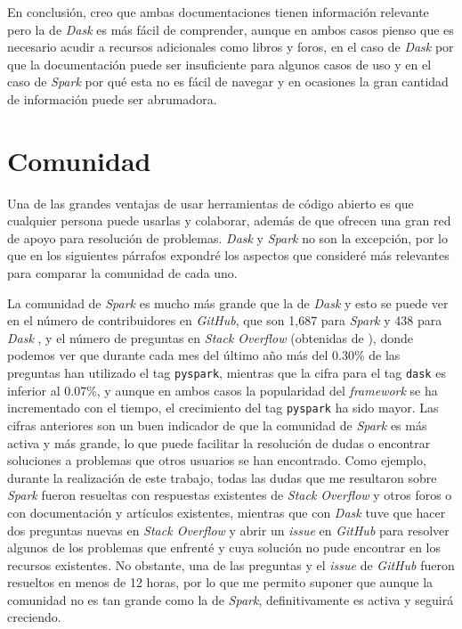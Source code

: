 En conclusión, creo que ambas documentaciones tienen información relevante pero la de \textit{Dask} es más fácil de comprender, aunque en ambos casos pienso que es necesario acudir a recursos adicionales como libros y foros, en el caso de \textit{Dask} por que la documentación puede ser insuficiente para algunos casos de uso y en el caso de \textit{Spark} por qué esta no es fácil de navegar y en ocasiones la gran cantidad de información puede ser abrumadora.


\section{Comunidad}

Una de las grandes ventajas de usar herramientas de código abierto es que cualquier persona puede usarlas y colaborar, además de que ofrecen una gran red de apoyo para resolución de problemas. \textit{Dask} y \textit{Spark} no son la excepción, por lo que en los siguientes párrafos expondré los aspectos que consideré más relevantes para comparar la comunidad de cada uno.

La comunidad de \textit{Spark} es mucho más grande que la de \textit{Dask} y esto se puede ver en el número de contribuidores en \textit{GitHub}, que son 1,687 para \textit{Spark} \cite{repo-spark} y 438 para \textit{Dask} \cite{repo-dask}, y el número de preguntas en \textit{Stack Overflow} (obtenidas de \cite{stackoverflow-stats}), donde podemos ver que durante cada mes del último año más del 0.30\% de las preguntas han utilizado el tag \texttt{pyspark}, mientras que la cifra para el tag \texttt{dask} es inferior al 0.07\%, y aunque en ambos casos la popularidad del \textit{framework} se ha incrementado con el tiempo, el crecimiento del tag \texttt{pyspark} ha sido mayor. Las cifras anteriores son un buen indicador de que la comunidad de \textit{Spark} es más activa y más grande, lo que puede facilitar la resolución de dudas o encontrar soluciones a problemas que otros usuarios se han encontrado. Como ejemplo, durante la realización de este trabajo, todas las dudas que me resultaron sobre \textit{Spark} fueron resueltas con respuestas existentes de \textit{Stack Overflow} y otros foros o con documentación y artículos existentes, mientras que con \textit{Dask} tuve que hacer dos preguntas nuevas en \textit{Stack Overflow} y abrir un \textit{issue} en \textit{GitHub} para resolver algunos de los problemas que enfrenté y cuya solución no pude encontrar en los recursos existentes. No obstante, una de las preguntas y el \textit{issue} de \textit{GitHub} fueron resueltos en menos de 12 horas, por lo que me permito suponer que aunque la comunidad no es tan grande como la de \textit{Spark}, definitivamente es activa y seguirá creciendo. 

